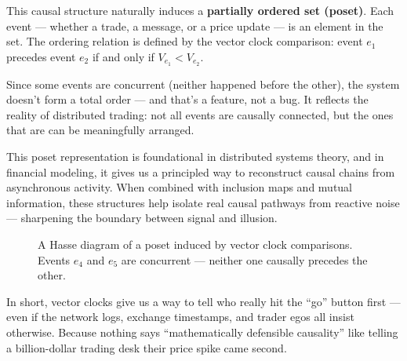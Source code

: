 \vspace{1em}
\noindent
This causal structure naturally induces a \textbf{partially ordered set (poset)}. Each event — whether a trade, a message, or a price update — is an element in the set. The ordering relation is defined by the vector clock comparison: event \( e_1 \) precedes event \( e_2 \) if and only if \( V_{e_1} < V_{e_2} \). 

Since some events are concurrent (neither happened before the other), the system doesn’t form a total order — and that’s a feature, not a bug. It reflects the reality of distributed trading: not all events are causally connected, but the ones that are can be meaningfully arranged.

This poset representation is foundational in distributed systems theory, and in financial modeling, it gives us a principled way to reconstruct causal chains from asynchronous activity. When combined with inclusion maps and mutual information, these structures help isolate real causal pathways from reactive noise — sharpening the boundary between signal and illusion.

\begin{figure}[H]
\centering
{}
\caption{A Hasse diagram of a poset induced by vector clock comparisons. Events \( e_4 \) and \( e_5 \) are concurrent — neither one causally precedes the other.}
\end{figure}

\vspace{1em}
\noindent
In short, vector clocks give us a way to tell who really hit the “go” button first — even if the network logs, exchange timestamps, and trader egos all insist otherwise. Because nothing says “mathematically defensible causality” like telling a billion-dollar trading desk their price spike came second.


